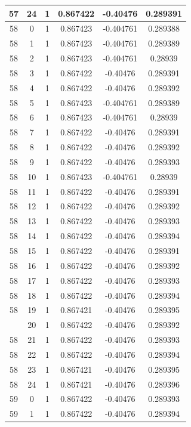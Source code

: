 \documentclass[12pt,a4paper]{article}
\numberwithin{equation}{section}
\numberwithin{figure}{section}
\numberwithin{table}{section}
\begin{document}
\begin{longtable}{|c|c|c|c|c|c|}
57 & 24 & 1 & 0.867422 & -0.40476 & 0.289391 \\ \hline
58 & 0 & 1 & 0.867423 & -0.404761 & 0.289388 \\ \hline
58 & 1 & 1 & 0.867423 & -0.404761 & 0.289389 \\ \hline
58 & 2 & 1 & 0.867423 & -0.404761 & 0.28939 \\ \hline
58 & 3 & 1 & 0.867422 & -0.40476 & 0.289391 \\ \hline
58 & 4 & 1 & 0.867422 & -0.40476 & 0.289392 \\ \hline
58 & 5 & 1 & 0.867423 & -0.404761 & 0.289389 \\ \hline
58 & 6 & 1 & 0.867423 & -0.404761 & 0.28939 \\ \hline
58 & 7 & 1 & 0.867422 & -0.40476 & 0.289391 \\ \hline
58 & 8 & 1 & 0.867422 & -0.40476 & 0.289392 \\ \hline
58 & 9 & 1 & 0.867422 & -0.40476 & 0.289393 \\ \hline
58 & 10 & 1 & 0.867423 & -0.404761 & 0.28939 \\ \hline
58 & 11 & 1 & 0.867422 & -0.40476 & 0.289391 \\ \hline
58 & 12 & 1 & 0.867422 & -0.40476 & 0.289392 \\ \hline
58 & 13 & 1 & 0.867422 & -0.40476 & 0.289393 \\ \hline
58 & 14 & 1 & 0.867422 & -0.40476 & 0.289394 \\ \hline
58 & 15 & 1 & 0.867422 & -0.40476 & 0.289391 \\ \hline
58 & 16 & 1 & 0.867422 & -0.40476 & 0.289392 \\ \hline
58 & 17 & 1 & 0.867422 & -0.40476 & 0.289393 \\ \hline
58 & 18 & 1 & 0.867422 & -0.40476 & 0.289394 \\ \hline
58 & 19 & 1 & 0.867421 & -0.40476 & 0.289395 \\ \hline
\pagebreak
58 & 20 & 1 & 0.867422 & -0.40476 & 0.289392 \\ \hline
58 & 21 & 1 & 0.867422 & -0.40476 & 0.289393 \\ \hline
58 & 22 & 1 & 0.867422 & -0.40476 & 0.289394 \\ \hline
58 & 23 & 1 & 0.867421 & -0.40476 & 0.289395 \\ \hline
58 & 24 & 1 & 0.867421 & -0.40476 & 0.289396 \\ \hline
59 & 0 & 1 & 0.867422 & -0.40476 & 0.289393 \\ \hline
59 & 1 & 1 & 0.867422 & -0.40476 & 0.289394 \\ \hline

\end{longtable}
\end{document}
